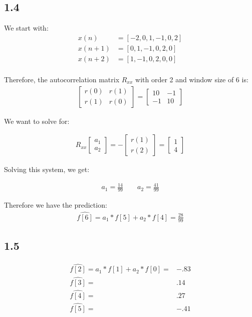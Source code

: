 \documentclass[12pt]{article}
\begin{document}
\subsection*{1.4}
We start with:
\begin{align*}
x(n) &= [-2, 0, 1, -1, 0, 2]\\
x(n+1) &= [0, 1, -1, 0, 2, 0]\\
x(n+2) &= [1, -1, 0, 2, 0, 0]\\
\end{align*}

Therefore, the autocorrelation matrix $R_{xx}$ with order 2 and window size of 6 is:
\begin{align*}
\begin{bmatrix}
r(0) & r(1) \\
r(1) & r(0)
\end{bmatrix}
= \begin{bmatrix}
10 & -1 \\
-1 & 10
\end{bmatrix}
\end{align*}

We want to solve for:

\begin{align*}
R_{xx}
\begin{bmatrix}
a_1 \\
a_2
\end{bmatrix}
=
-\begin{bmatrix}
r(1)\\
r(2)
\end{bmatrix}
=
\begin{bmatrix}
1 \\
4
\end{bmatrix}
\end{align*}

Solving this system, we get:

\begin{align*}
a_1 = \frac{14}{99} \qquad a_2 = \frac{41}{99}
\end{align*}

Therefore we have the prediction:
\begin{align*}
\hat{f[6]} = a_1 * f[5] + a_2 * f[4] = \frac{28}{99}
\end{align*}


\subsection*{1.5}
\begin{align*}
\hat{f[2]} = a_1 * f[1] + a_2 * f[0] =& -.83 \\
\hat{f[3]} =& .14\\
\hat{f[4]} =& .27\\
\hat{f[5]} =& -.41\\
\end{align*}
\end{document}
